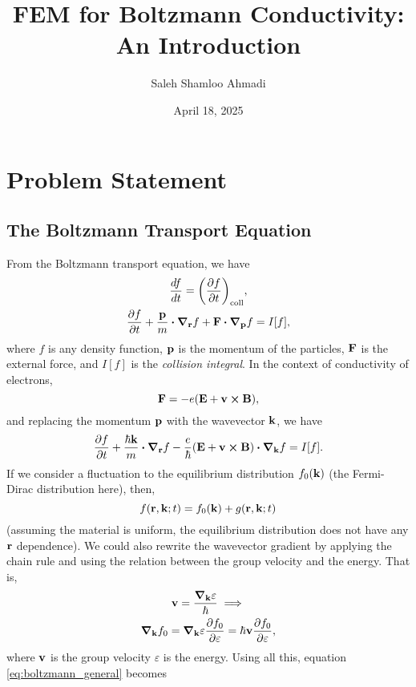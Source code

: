 \documentclass[12pt]{article}
\title{FEM for Boltzmann Conductivity: An Introduction}
\author{Saleh Shamloo Ahmadi}
\date{April 18, 2025}
\begin{document}
\maketitle
\section{Problem Statement}
\subsection{The Boltzmann Transport Equation}
From the Boltzmann transport equation, we have
\begin{gather}
    \dv{f}{t} = \qty(\pdv{f}{t})_{\text{coll}}, \\
    \pdv{f}{t} + \frac{\vb{p}}{m}\vdot\grad_{\vb{r}} f + \vb{F}\vdot\grad_{\vb{p}}f = I[f],
\end{gather}
where $f$ is any density function, $\vb{p}$ is the momentum of the particles, $\vb{F}$ is the
external force, and $I[f]$ is the \emph{collision integral}. In the context of conductivity of
electrons,
\begin{equation}
    \vb{F} = -e\qty(\vb{E} + \vb{v}\cross\vb{B}),
\end{equation}
and replacing the momentum $\vb{p}$ with the wavevector $\vb{k}$, we have
\begin{equation}
    \pdv{f}{t} + \frac{\hbar\vb{k}}{m}\vdot\grad_{\vb{r}} f
    - \frac{e}{\hbar}\qty(\vb{E} + \vb{v}\cross\vb{B})\vdot\grad_{\vb{k}}f = I[f].
    \label{eq:boltzmann_general}
\end{equation}
If we consider a fluctuation to the equilibrium distribution $f_0(\vb{k})$ (the Fermi-Dirac
distribution here), then,
\begin{equation}
    f(\vb{r}, \vb{k}; t) = f_0(\vb{k}) + g(\vb{r}, \vb{k}; t)
\end{equation}
(assuming the material is uniform, the equilibrium distribution does not have any $\vb{r}$
dependence). We could also rewrite the wavevector gradient by applying the chain rule and using
the relation between the group velocity and the energy. That is,
\begin{gather}
    \vb{v} = \frac{\grad_{\vb{k}}\varepsilon}{\hbar} \implies \\
    \grad_{\vb{k}}f_0 = \grad_{\vb{k}}\varepsilon \pdv{f_0}{\varepsilon}
    = \hbar\vb{v} \pdv{f_0}{\varepsilon},
\end{gather}
where $\vb{v}$ is the group velocity $\varepsilon$ is the energy. Using all this, equation
\eqref{eq:boltzmann_general} becomes
\end{document}
